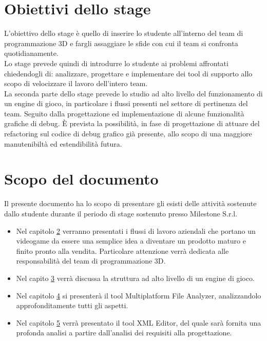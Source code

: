 \section{Obiettivi dello stage}

L'obiettivo dello stage è quello di inserire lo studente all'interno del team di programmazione 3D e fargli assaggiare le sfide con cui il team si confronta quotidianamente.\\

Lo stage prevede quindi di introdurre lo studente ai problemi affrontati chiedendogli di: analizzare, progettare e implementare dei tool di supporto allo scopo di velocizzare il lavoro dell'intero team.\\

La seconda parte dello stage prevede lo studio ad alto livello del funzionamento di un engine di gioco, in particolare i flussi presenti nel settore di pertinenza del team. Seguito dalla progettazione ed implementazione di alcune funzionalità grafiche di debug. È prevista la possibilità, in fase di progettazione di attuare del refactoring sul codice di debug grafico già presente, allo scopo di una maggiore manutenibiltà ed estendibilità futura.

\section{Scopo del documento}

Il presente documento ha lo scopo di presentare gli esisti delle attività sostenute dallo studente durante il periodo di stage sostenuto presso Milestone S.r.l.\\

\begin{itemize}
	\item Nel capitolo \hyperref[cap:flussi-aziendali]{2} verranno presentati i flussi di lavoro aziendali che portano un videogame da essere una semplice idea a diventare un prodotto maturo e finito pronto alla vendita. Particolare attenzione verrà dedicata alle responsabilità del team di programmazione 3D.
	
	\item Nel capito \hyperref[cap:engine-di-gioco]{3} verrà discussa la struttura ad alto livello di un engine di gioco.
	
	\item Nel capitolo \hyperref[cap:multiplatform-file-analyzer]{4} si presenterà il tool Multiplatform File Analyzer, analizzandolo approfonditamente tutti gli aspetti.
	
	\item Nel capitolo \hyperref[cap:xml-editor]{5} verrà presentato il tool XML Editor, del quale sarà fornita una profonda analisi a partire dall'analisi dei requisiti alla progettazione.
\end{itemize}

